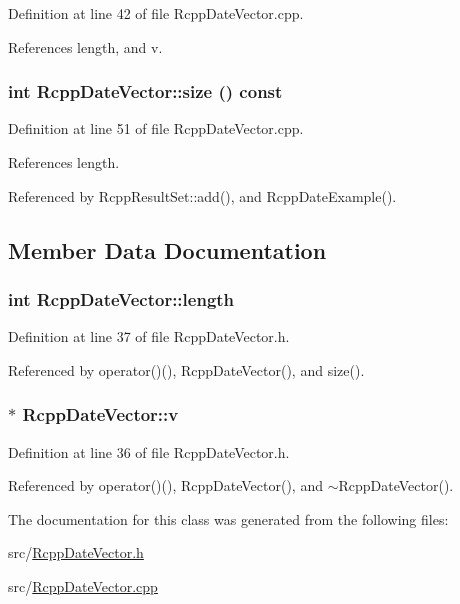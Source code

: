 Definition at line 42 of file RcppDateVector.cpp.

References length, and v.\hypertarget{classRcppDateVector_ac308c17e5e79ceb69600e306a7983a9a}{
\subsubsection[{size}]{\setlength{\rightskip}{0pt plus 5cm}int RcppDateVector::size () const}}
\label{classRcppDateVector_ac308c17e5e79ceb69600e306a7983a9a}


Definition at line 51 of file RcppDateVector.cpp.

References length.

Referenced by RcppResultSet::add(), and RcppDateExample().

\subsection{Member Data Documentation}
\hypertarget{classRcppDateVector_aa36764f68111a84b737b78600ff06433}{
\subsubsection[{length}]{\setlength{\rightskip}{0pt plus 5cm}int {\bf RcppDateVector::length}}}
\label{classRcppDateVector_aa36764f68111a84b737b78600ff06433}


Definition at line 37 of file RcppDateVector.h.

Referenced by operator()(), RcppDateVector(), and size().\hypertarget{classRcppDateVector_afaa34ebaf3d8bac309e81895c376f545}{
\subsubsection[{v}]{$\ast$ {\bf RcppDateVector::v}}}
\label{classRcppDateVector_afaa34ebaf3d8bac309e81895c376f545}


Definition at line 36 of file RcppDateVector.h.

Referenced by operator()(), RcppDateVector(), and $\sim$RcppDateVector().

The documentation for this class was generated from the following files:\begin{DoxyCompactItemize}
\item 
src/\hyperlink{RcppDateVector_8h}{RcppDateVector.h}\item 
src/\hyperlink{RcppDateVector_8cpp}{RcppDateVector.cpp}\end{DoxyCompactItemize}
